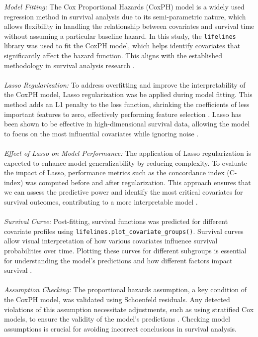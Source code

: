 \textit{Model Fitting:} The Cox Proportional Hazards (CoxPH) model is a widely used regression method in survival analysis due to its semi-parametric nature, which allows flexibility in handling the relationship between covariates and survival time without assuming a particular baseline hazard. In this study, the \texttt{lifelines} library \parencite{davidson-pilon_lifelines_2024} was used to fit the CoxPH model, which helps identify covariates that significantly affect the hazard function. This aligns with the established methodology in survival analysis research \parencite{cox_regression_1972}.
\\\\
\noindent \textit{Lasso Regularization:} To address overfitting and improve the interpretability of the CoxPH model, Lasso regularization was be applied during model fitting. This method adds an L1 penalty to the loss function, shrinking the coefficients of less important features to zero, effectively performing feature selection \parencite{tibshirani_regression_1996}. Lasso has been shown to be effective in high-dimensional survival data, allowing the model to focus on the most influential covariates while ignoring noise \parencite{zhang_adaptive_2007}.
\\\\
\noindent \textit{Effect of Lasso on Model Performance:} The application of Lasso regularization is expected to enhance model generalizability by reducing complexity. To evaluate the impact of Lasso, performance metrics such as the concordance index (C-index) was computed before and after regularization. This approach ensures that we can assess the predictive power and identify the most critical covariates for survival outcomes, contributing to a more interpretable model \parencite{freijeirogonzalez_critical_2022}.
\\\\
\noindent \textit{Survival Curve:} Post-fitting, survival functions was predicted for different covariate profiles using \texttt{lifelines.plot\_covariate\_groups()}. Survival curves allow visual interpretation of how various covariates influence survival probabilities over time. Plotting these curves for different subgroups is essential for understanding the model's predictions and how different factors impact survival \parencite{harrell__regression_2015}.
\\\\
\noindent \textit{Assumption Checking:} The proportional hazards assumption, a key condition of the CoxPH model, was validated using Schoenfeld residuals. Any detected violations of this assumption necessitate adjustments, such as using stratified Cox models, to ensure the validity of the model's predictions \parencite{woo_time_2023}. Checking model assumptions is crucial for avoiding incorrect conclusions in survival analysis.

